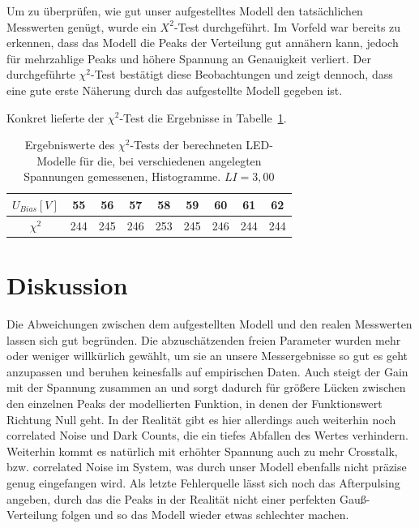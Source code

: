\documentclass[12pt]{article}
\begin{document}
Um zu überprüfen, wie gut unser aufgestelltes Modell den tatsächlichen Messwerten genügt, wurde ein $X^{2}$-Test durchgeführt.
Im Vorfeld war bereits zu erkennen, dass das Modell die Peaks der Verteilung gut annähern kann, jedoch für mehrzahlige Peaks und höhere Spannung an Genauigkeit verliert.
Der durchgeführte $\chi^{2}$-Test bestätigt diese Beobachtungen und zeigt dennoch, dass eine gute erste Näherung durch das aufgestellte Modell gegeben ist.

Konkret lieferte der $\chi^{2}$-Test die Ergebnisse in Tabelle~\ref{table:Chi2Test}.

\begin{table}[h!]
  \begin{center}
    \begin{tabular}{|c|cccccccc|}
      \hline
      $U_{Bias} [V]$ & 55 & 56 & 57 & 58 & 59 & 60 & 61 & 62 \\
      \hline
      $\chi^{2}$& 244 & 245 & 246 & 253& 245 & 246 & 244 & 244 \\
      \hline
    \end{tabular}
    \caption{Ergebniswerte des $\chi^{2}$-Tests der berechneten LED-Modelle für die, bei verschiedenen angelegten Spannungen gemessenen, Histogramme. $LI=3,00$}
    \label{table:Chi2Test}
  \end{center}
\end{table}


\section{Diskussion}
Die Abweichungen zwischen dem aufgestellten Modell und den realen Messwerten lassen sich gut begründen.
Die abzuschätzenden freien Parameter wurden mehr oder weniger willkürlich gewählt, um sie an unsere Messergebnisse so gut es geht anzupassen und beruhen keinesfalls auf empirischen Daten.
Auch steigt der Gain mit der Spannung zusammen an und sorgt dadurch für größere Lücken zwischen den einzelnen Peaks der modellierten Funktion, in denen der Funktionswert Richtung Null geht. In der Realität gibt es hier allerdings auch weiterhin noch correlated Noise und Dark Counts, die ein tiefes Abfallen des Wertes verhindern.
Weiterhin kommt es natürlich mit erhöhter Spannung auch zu mehr Crosstalk, bzw. correlated Noise im System, was durch unser Modell ebenfalls nicht präzise genug eingefangen wird.
Als letzte Fehlerquelle lässt sich noch das Afterpulsing angeben, durch das die Peaks in der Realität nicht einer perfekten Gauß-Verteilung folgen und so das Modell wieder etwas schlechter machen.
\end{document}
